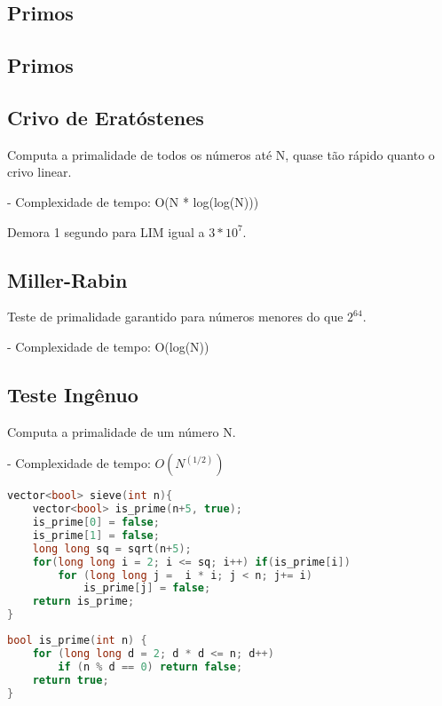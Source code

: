 \documentclass[11pt, a4paper, twoside]{article}
\begin{document}
\subsection{Primos}

\subsection{Primos}



\subsection{Crivo de Eratóstenes}

Computa a primalidade de todos os números até N, quase tão rápido quanto o crivo linear.

- Complexidade de tempo: O(N * log(log(N)))

Demora 1 segundo para LIM igual a $3 * 10^7$.

\subsection{Miller-Rabin}

Teste de primalidade garantido para números menores do que $2^64$.

- Complexidade de tempo: O(log(N))

\subsection{Teste Ingênuo}

Computa a primalidade de um número N.

- Complexidade de tempo: $O(N^(1/2))$

\begin{multicols}{2}
\begin{lstlisting}[language=C++]
vector<bool> sieve(int n){
    vector<bool> is_prime(n+5, true);
    is_prime[0] = false;
    is_prime[1] = false;
    long long sq = sqrt(n+5);
    for(long long i = 2; i <= sq; i++) if(is_prime[i])
        for (long long j =  i * i; j < n; j+= i)
            is_prime[j] = false;
    return is_prime;
}
\end{lstlisting}
\end{multicols}

\begin{multicols}{2}
\begin{lstlisting}[language=C++]
bool is_prime(int n) {
    for (long long d = 2; d * d <= n; d++)
        if (n % d == 0) return false;
    return true;
}
\end{lstlisting}
\end{multicols}
\end{document}
